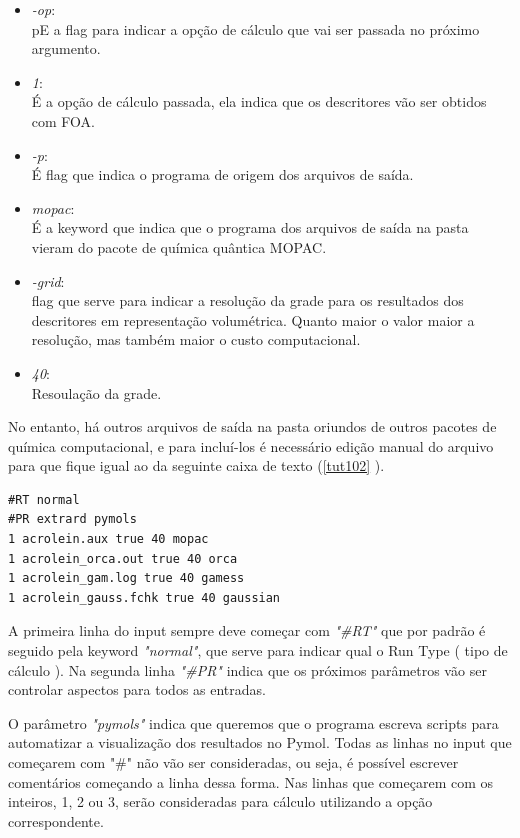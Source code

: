 \documentclass[a4paper,11pt]{refart}
\begin{document}
\begin{itemize}
	\item \emph{-op}:\\ pE a flag para indicar a opção de cálculo que vai ser passada no próximo argumento.
	\item \emph{1}: \\É a opção de cálculo passada, ela indica que os descritores vão ser obtidos com FOA.
	\item \emph{-p}: \\É flag que indica o programa de origem dos arquivos de saída.
	\item \emph{mopac}: \\ É a keyword que indica que o programa dos arquivos de saída na pasta vieram do pacote de química quântica MOPAC.
	\item \emph{-grid}: \\ flag que serve para indicar a resolução da grade para os resultados dos descritores em representação volumétrica. Quanto maior o valor maior a resolução, mas também maior o custo computacional.
	\item \emph{40}: \\ Resoulação da grade.
\end{itemize}

No entanto, há outros arquivos de saída na pasta oriundos de outros pacotes de química computacional, e para incluí-los é necessário edição manual do arquivo para que fique igual ao da seguinte caixa de texto (\autoref{tut102} ).

\begin{minipage}{\textwidth}
\begin{lstlisting}[caption={Input editado para execução do tutorial.},label={tut102}]
#RT normal 
#PR extrard pymols
1 acrolein.aux true 40 mopac 
1 acrolein_orca.out true 40 orca 
1 acrolein_gam.log true 40 gamess
1 acrolein_gauss.fchk true 40 gaussian 
\end{lstlisting}
\end{minipage}

A primeira linha do input sempre deve começar com \emph{"\#RT"} que por padrão é seguido pela keyword \emph{"normal"}, que serve para indicar qual o Run Type ( tipo de cálculo ). Na segunda linha \emph{"\#PR"} indica que os próximos parâmetros vão ser controlar aspectos para todos as entradas.

O parâmetro \emph{"pymols"} indica que queremos que o programa escreva scripts para automatizar a visualização dos resultados no Pymol. Todas as linhas no input que começarem com "\#" não vão ser consideradas, ou seja, é possível escrever comentários começando a linha dessa forma. Nas linhas que começarem com os inteiros, 1, 2 ou 3, serão consideradas para cálculo utilizando a opção correspondente.
\end{document}

